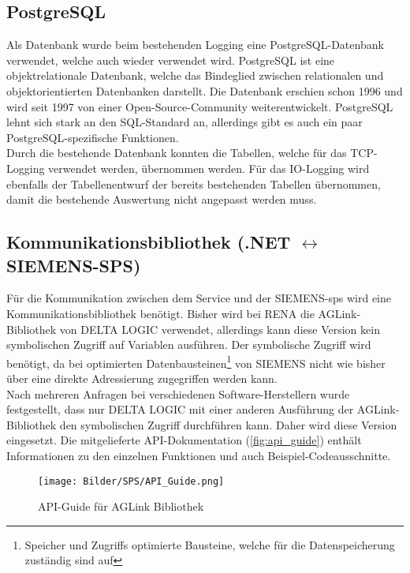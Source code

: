 \subsection{PostgreSQL}
Als Datenbank wurde beim bestehenden Logging eine PostgreSQL-Datenbank \cite{postgresql} verwendet, welche auch wieder verwendet wird. PostgreSQL ist eine objektrelationale Datenbank, welche das Bindeglied zwischen relationalen und objektorientierten Datenbanken darstellt. Die Datenbank erschien schon 1996 und wird seit 1997 von einer Open-Source-Community weiterentwickelt. PostgreSQL lehnt sich stark an den SQL-Standard an, allerdings gibt es auch ein paar PostgreSQL-spezifische Funktionen.
\ \\
Durch die bestehende Datenbank konnten die Tabellen, welche für das TCP-Logging verwendet werden, übernommen werden. Für das IO-Logging wird ebenfalls der Tabellenentwurf der bereits bestehenden Tabellen übernommen, damit die bestehende Auswertung nicht angepasst werden muss.

\subsection{Kommunikationsbibliothek (.NET $\leftrightarrow$ SIEMENS-SPS)}
Für die Kommunikation zwischen dem Service und der SIEMENS-\ac{sps} wird eine Kommunikationsbibliothek benötigt. Bisher wird bei RENA die AGLink-Bibliothek von DELTA LOGIC verwendet, allerdings kann diese Version kein symbolischen Zugriff auf Variablen ausführen. Der symbolische Zugriff wird benötigt, da bei optimierten Datenbausteinen\footnote[1]{Speicher und Zugriffs optimierte Bausteine, welche für die Datenspeicherung zuständig sind auf } von SIEMENS nicht wie bisher über eine direkte Adressierung zugegriffen werden kann.
\ \\
Nach mehreren Anfragen bei verschiedenen Software-Herstellern wurde festgestellt, dass nur DELTA LOGIC mit einer anderen Ausführung der AGLink-Bibliothek den symbolischen Zugriff durchführen kann. Daher wird diese Version eingesetzt. Die mitgelieferte API-Dokumentation (\autoref{fig:api_guide})  enthält Informationen zu den einzelnen Funktionen und auch Beispiel-Codeausschnitte. 

\begin{figure}
\centering
 \texttt{[image: Bilder/SPS/API\_Guide.png]}
 \caption[API-Guide für AGLink Bibliothek]{API-Guide für AGLink Bibliothek}
 \label{fig:api_guide}
\end{figure}